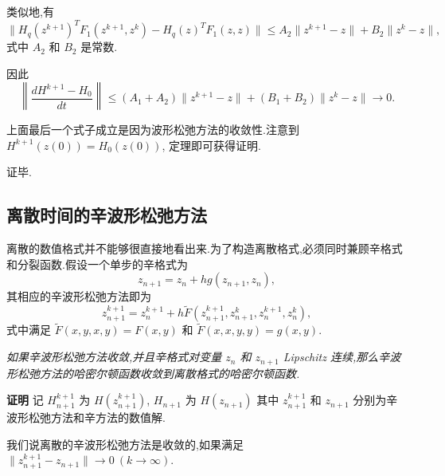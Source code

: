 类似地,有
\begin{equation*}
\|H_q(z^{k+1})^TF_1(z^{k+1},z^{k})-H_q(z)^TF_1(z,z)\|\le A_2\|z^{k+1}-z\|+B_2\|z^{k}-z\|,
\end{equation*}
式中 $A_2$ 和 $B_2$ 是常数.

因此
\begin{equation*}
\left\|\frac{dH^{k+1}-H_0}{dt}\right\|\le (A_1+A_2)\|z^{k+1}-z\|+(B_1+B_2)\|z^{k}-z\| \to 0.
\end{equation*}

上面最后一个式子成立是因为波形松弛方法的收敛性.注意到 $H^{k+1}(z(0))=H_0(z(0))$, 定理即可获得证明.

证毕.

\subsection{离散时间的辛波形松弛方法}
离散的数值格式并不能够很直接地看出来.为了构造离散格式,必须同时兼顾辛格式和分裂函数.假设一个单步的辛格式为
\begin{equation*}
z_{n+1}=z_{n}+h g(z_{n+1},z_{n}),
\end{equation*}
其相应的辛波形松弛方法即为
\begin{equation}\label{eq:discrete}
z_{n+1}^{k+1}=z_{n}^{k+1}+h \tilde{F}(z_{n+1}^{k+1},z_{n+1}^{k},z_{n}^{k+1},z_{n}^{k}),
\end{equation}
式中满足 $\tilde{F}(x,y,x,y)=F(x,y)$ 和 $\tilde{F}(x,x,y,y)=g(x,y)$.

\begin{theorem}
\emph{如果辛波形松弛方法收敛,并且辛格式对变量 $z_{n}$ 和 $z_{n+1}$ Lipschitz 连续,那么辛波形松弛方法的哈密尔顿函数收敛到离散格式的哈密尔顿函数.}
\end{theorem}

{\textbf{证明}} 记 $H^{k+1}_{n+1}$ 为 $H(z_{n+1}^{k+1})$, $H_{n+1}$ 为 $H(z_{n+1})$ 其中 $z_{n+1}^{k+1}$ 和 $z_{n+1}$ 分别为辛波形松弛方法和辛方法的数值解.

我们说离散的辛波形松弛方法是收敛的,如果满足 $\|z_{n+1}^{k+1} - z_{n+1}\| \to 0~(k \to \infty)$.

